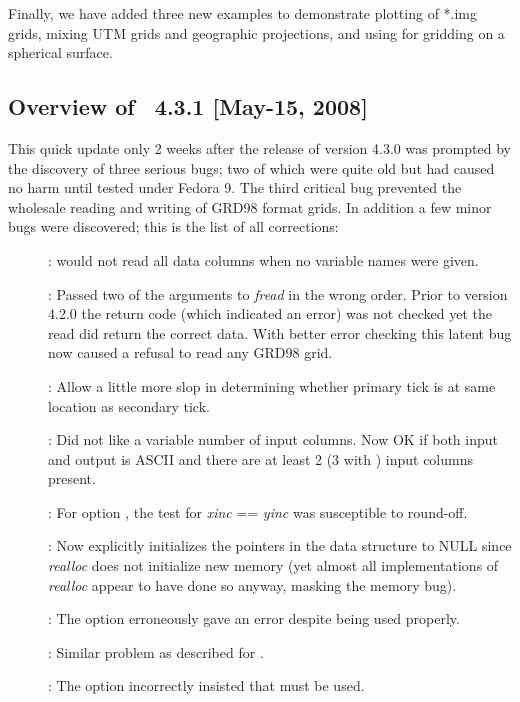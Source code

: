 Finally, we have added three new examples to demonstrate plotting of *.img grids, mixing UTM grids and geographic projections,
and using  for gridding on a spherical surface.

\subsection{Overview of \gmt\ 4.3.1 [May-15, 2008]}

This quick update only 2 weeks after the release of version 4.3.0 was prompted by the discovery of three
serious bugs; two of which were quite old but had caused no harm until tested under Fedora 9.
The third critical bug prevented the wholesale reading and writing of GRD98 format grids.  In addition
a few minor bugs were discovered; this is the list of all corrections:
\begin{description}
\item []:  would not read all data columns when no variable names were given.
\item []: Passed two of the arguments to {\it fread} in the wrong order. Prior to version 4.2.0
the return code (which indicated an error) was not checked yet the read did return the correct data.
With better error checking this latent bug now caused a refusal to read any GRD98 grid.
\item []: Allow a little more slop in determining whether primary tick
is at same location as secondary tick.
\item []: Did not like a variable number of input columns.  Now OK if both input and output is ASCII
and there are at least 2 (3 with ) input columns present.
\item []: For option , the test for {\it xinc} == {\it yinc} was susceptible to round-off.
\item []: Now explicitly initializes the pointers in the data structure to NULL since {\it realloc} does not
initialize new memory (yet almost all implementations of {\it realloc} appear to have done so anyway, masking the memory bug).
\item []: The  option erroneously gave an error despite being used properly.
\item []: Similar problem as described for .
\item []: The  option incorrectly insisted that  must be used.
\end{description}

